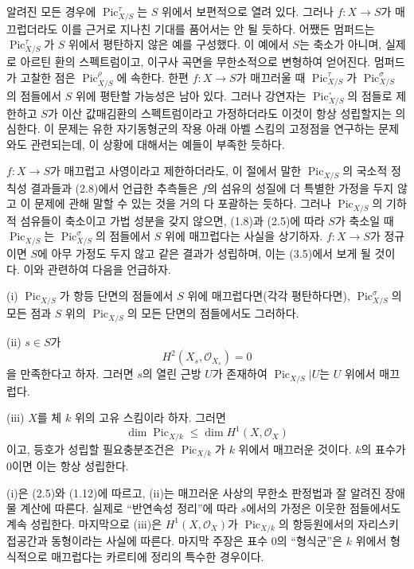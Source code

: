  알려진 모든 경우에
$\operatorname{Pic}_{X/S}^\tau$는 $S$ 위에서 보편적으로 열려 있다. 그러나
$f:X\longrightarrow S$가 매끄럽더라도 이를 근거로 지나친 기대를 품어서는
안 될 듯하다. 어쨌든 멈퍼드는 $\operatorname{Pic}_{X/S}^\tau$가 $S$
위에서 평탄하지 않은 예를 구성했다. 이 예에서 $S$는 축소가 아니며, 실제로
아르틴 환의 스펙트럼이고, 이구사 곡면을 무한소적으로 변형하여 얻어진다.
멈퍼드가 고찰한 점은 $\operatorname{Pic}_{X/S}^\rho$에 속한다. 한편
$f:X\longrightarrow S$가 매끄러울 때 $\operatorname{Pic}_{X/S}^\tau$가
$\operatorname{Pic}_{X/S}^\sigma$의 점들에서 $S$ 위에 평탄할 가능성은
남아 있다. 그러나 강연자는 $\operatorname{Pic}_{X/S}^\circ$의 점들로
제한하고 $S$가 이산 값매김환의 스펙트럼이라고 가정하더라도 이것이 항상
성립할지는 의심한다. 이 문제는 유한 자기동형군의 작용 아래 아벨 스킴의
고정점을 연구하는 문제와도 관련되는데, 이 상황에 대해서는 예들이 부족한
듯하다.

$f:X\longrightarrow S$가 매끄럽고 사영이라고 제한하더라도, 이 절에서 말한
$\operatorname{Pic}_{X/S}$의 국소적 정칙성 결과들과 (2.8)에서 언급한
추측들은 $f$의 섬유의 성질에 더 특별한 가정을 두지 않고 이 문제에 관해 말할
수 있는 것을 거의 다 포괄하는 듯하다. 그러나
$\operatorname{Pic}_{X/S}$의 기하적 섬유들이 축소이고 가법 성분을 갖지
않으면, (1.8)과 (2.5)에 따라 $S$가 축소일 때
$\operatorname{Pic}_{X/S}$는 $\operatorname{Pic}_{X/S}^\sigma$의 점들에서
$S$ 위에 매끄럽다는 사실을 상기하자. $f:X\longrightarrow S$가 정규이면
$S$에 아무 가정도 두지 않고 같은 결과가 성립하며, 이는 (3.5)에서 보게 될
것이다. 이와 관련하여 다음을 언급하자.


\noindent(i) $\operatorname{Pic}_{X/S}$가 항등 단면의 점들에서 $S$ 위에
매끄럽다면(각각 평탄하다면), $\operatorname{Pic}_{X/S}^\sigma$의 모든
점과 $S$ 위의 $\operatorname{Pic}_{X/S}$의 모든 단면의 점들에서도 그러하다.

\noindent(ii) $s\in S$가
\[
H^2(X_s,\mathcal O_{X_s})=0
\]
을 만족한다고 하자. 그러면 $s$의 열린 근방 $U$가 존재하여
$\operatorname{Pic}_{X/S}|U$는 $U$ 위에서 매끄럽다.

\noindent(iii) $X$를 체 $k$ 위의 고유 스킴이라 하자. 그러면
\[
\dim\operatorname{Pic}_{X/k}\leq\dim H^1(X,\mathcal O_X)
\]
이고, 등호가 성립할 필요충분조건은 $\operatorname{Pic}_{X/k}$가 $k$ 위에서
매끄러운 것이다. $k$의 표수가 0이면 이는 항상 성립한다.

(i)은 (2.5)와 (1.12)에 따르고, (ii)는 매끄러운 사상의 무한소 판정법과 잘
알려진 장애물 계산에 따른다. 실제로 ``반연속성 정리''에 따라 $s$에서의
가정은 이웃한 점들에서도 계속 성립한다. 마지막으로 (iii)은
$H^1(X,\mathcal O_X)$가 $\operatorname{Pic}_{X/k}$의 항등원에서의 자리스키
접공간과 동형이라는 사실에 따른다. 마지막 주장은 표수 0의 ``형식군''은
$k$ 위에서 형식적으로 매끄럽다는 카르티에 정리의 특수한 경우이다.

